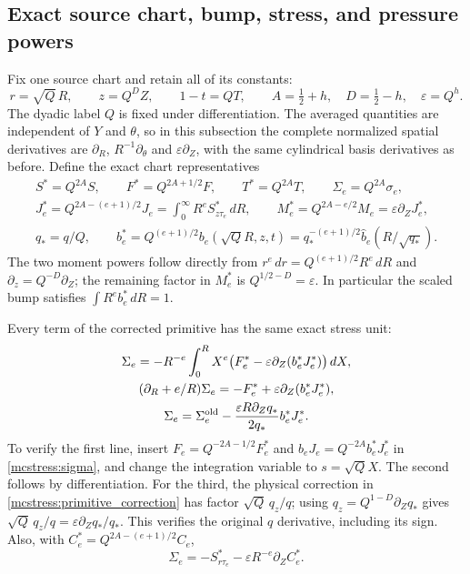 \subsection{Exact source chart, bump, stress, and pressure powers}

Fix one source chart and retain all of its constants:
\begin{equation}\label{mcstress:chart}
 r=\sqrt Q\,R,\qquad z=Q^D Z,\qquad1-t=QT,
 \qquad A=\tfrac12+h,\quad D=\tfrac12-h,\quad
 \varepsilon=Q^h.
\end{equation}
The dyadic label $Q$ is fixed under differentiation. The averaged quantities
are independent of $Y$ and $\theta$, so in this
subsection the complete normalized spatial derivatives are
$\partial_R$, $R^{-1}\partial_\theta$ and $\varepsilon\partial_Z$,
with the same cylindrical basis derivatives as before.
Define the exact chart representatives
\begin{equation}\label{mcstress:chart_representatives}
\begin{gathered}
 S^*=Q^{2A}S,\qquad F^*=Q^{2A+1/2}F,\qquad
 T^*=Q^{2A}T,\qquad \Sigma_e=Q^{2A}\sigma_e,\\
 J_e^*=Q^{2A-(e+1)/2}J_e
             =\int_0^\infty R^e S^*_{z\tau_e}\,dR,\qquad
 M_e^*=Q^{2A-e/2}M_e=\varepsilon\partial_ZJ_e^*,\\
 q_*=q/Q,\qquad
 b_e^*=Q^{(e+1)/2}b_e(\sqrt Q R,z,t)
       =q_*^{-(e+1)/2}\widehat b_e(R/\sqrt{q_*}).
\end{gathered}
\end{equation}
The two moment powers follow directly from
$r^e\,dr=Q^{(e+1)/2}R^e\,dR$ and
$\partial_z=Q^{-D}\partial_Z$; the remaining factor in $M_e^*$
is $Q^{1/2-D}=\varepsilon$. In particular the scaled bump satisfies
$\int R^e b_e^*\,dR=1$.

Every term of the corrected primitive has the same exact stress unit:
\begin{equation}\label{mcstress:chart_sigma}
\begin{gathered}
 \Sigma_e=-R^{-e}\int_0^R X^e
             \bigl(F_e^*-\varepsilon\partial_Z(b_e^*J_e^*)\bigr)\,dX,\\
 (\partial_R+e/R)\Sigma_e
       =-F_e^*+\varepsilon\partial_Z(b_e^*J_e^*),\\
 \Sigma_e=\Sigma_e^{\rm old}
       -\frac{\varepsilon R\partial_Zq_*}{2q_*}b_e^*J_e^*.
\end{gathered}
\end{equation}
To verify the first line, insert
$F_e=Q^{-2A-1/2}F_e^*$ and $b_eJ_e=Q^{-2A}b_e^*J_e^*$ in
\eqref{mcstress:sigma}, and change the integration variable to
$s=\sqrt Q X$. The second follows by differentiation. For the third,
the physical correction in \eqref{mcstress:primitive_correction}
has factor $\sqrt Q\,q_z/q$; using
$q_z=Q^{1-D}\partial_Zq_*$ gives
$\sqrt Q\,q_z/q=\varepsilon\partial_Zq_*/q_*$.
This verifies the original $q$ derivative, including its sign.
Also, with $C_e^*=Q^{2A-(e+1)/2}C_e$,
\[
 \Sigma_e=-S^*_{r\tau_e}
                     -\varepsilon R^{-e}\partial_Z C_e^*.
\]

